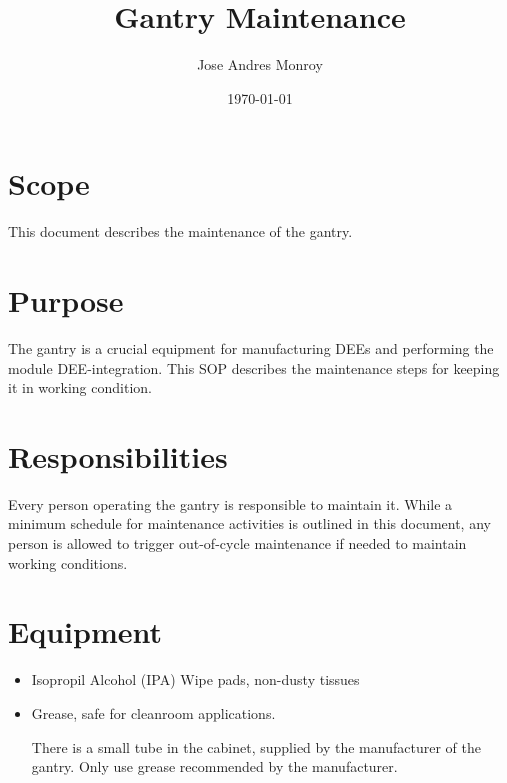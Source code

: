 \documentclass[12pt]{cornelltfpxsop}
\title{Gantry Maintenance\newline}
\date{\today}
\author{Jose Andres Monroy}
\begin{document}
\maketitle

\section{Scope}
This document describes the maintenance of the gantry.

\section{Purpose}
The gantry is a crucial equipment for manufacturing DEEs and performing the module DEE-integration. This SOP describes the maintenance steps for keeping it in working condition.


\section{Responsibilities}
Every person operating the gantry is responsible to maintain it. While a minimum schedule for maintenance activities is outlined in this document, any person is allowed to trigger out-of-cycle maintenance if needed to maintain working conditions.

\section{Equipment}

\begin{itemize}
    \item Isopropil Alcohol (IPA) Wipe pads, non-dusty tissues
    \item Grease, safe for cleanroom applications.

    There is a small tube in the cabinet, supplied by the manufacturer of the gantry. Only use grease recommended by the manufacturer.
\end{itemize}
\end{document}
